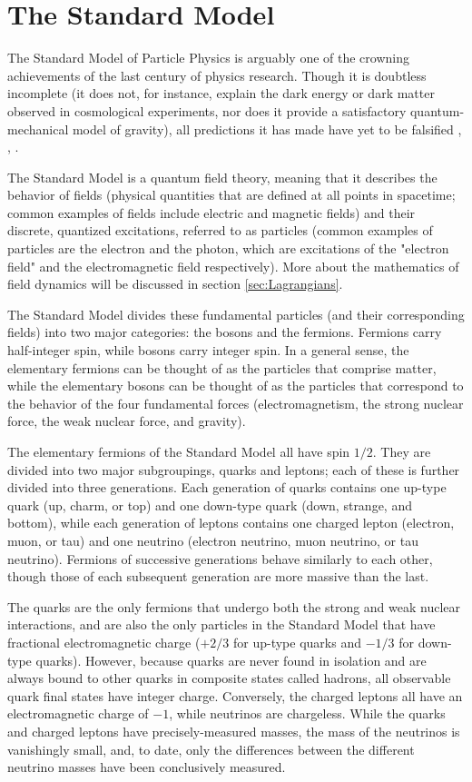 \section{The Standard Model} \label{sec:SM} 

The Standard Model of Particle Physics is arguably one of the crowning achievements of the last century of physics research. Though it is doubtless incomplete (it does not, for instance, explain the dark energy or dark matter observed in cosmological experiments, nor does it provide a satisfactory quantum-mechanical model of gravity), all predictions it has made have yet to be falsified \cite{Peskin}, \cite{kane_2017}, \cite{Griffiths}.

The Standard Model is a quantum field theory, meaning that it describes the behavior of fields (physical quantities that are defined at all points in spacetime; common examples of fields include electric and magnetic fields) and their discrete, quantized excitations, referred to as particles (common examples of particles are the electron and the photon, which are excitations of the "electron field" and the electromagnetic field respectively). More about the mathematics of field dynamics will be discussed in section \ref{sec:Lagrangians}.

The Standard Model divides these fundamental particles (and their corresponding fields) into two major categories: the bosons and the fermions. Fermions carry half-integer spin, while bosons carry integer spin. In a general sense, the elementary fermions can be thought of as the particles that comprise matter, while the elementary bosons can be thought of as the particles that correspond to the behavior of the four fundamental forces (electromagnetism, the strong nuclear force, the weak nuclear force, and gravity).

The elementary fermions of the Standard Model all have spin $1/2$. They are divided into two major subgroupings, quarks and leptons; each of these is further divided into three generations. Each generation of quarks contains one up-type quark (up, charm, or top) and one down-type quark (down, strange, and bottom), while each generation of leptons contains one charged lepton (electron, muon, or tau) and one neutrino (electron neutrino, muon neutrino, or tau neutrino). Fermions of successive generations behave similarly to each other, though those of each subsequent generation are more massive than the last.

The quarks are the only fermions that undergo both the strong and weak nuclear interactions, and are also the only particles in the Standard Model that have fractional electromagnetic charge ($+2/3$ for up-type quarks and $-1/3$ for down-type quarks). However, because quarks are never found in isolation and are always bound to other quarks in composite states called hadrons, all observable quark final states have integer charge. Conversely, the charged leptons all have an electromagnetic charge of $-1$, while neutrinos are chargeless. While the quarks and charged leptons have precisely-measured masses, the mass of the neutrinos is vanishingly small, and, to date, only the differences between the different neutrino masses have been conclusively measured.

